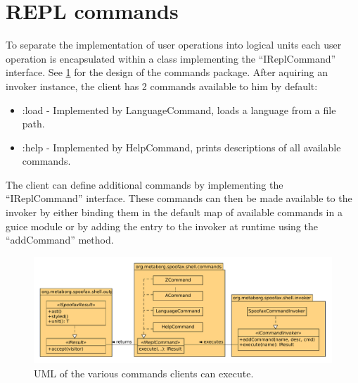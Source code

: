 \section{REPL commands}
\label{sec:commands}

To separate the implementation of user operations into logical units each user
operation is encapsulated within a class implementing the ``IReplCommand''
interface. See \cref{fig:uml-commands} for the design of the commands package.
After aquiring an invoker instance, the client has 2 commands available to him
by default:

\begin{itemize}
  \item :load - Implemented by LanguageCommand, loads a language from a file path.
  \item :help - Implemented by HelpCommand, prints descriptions of all available commands.
\end{itemize}

The client can define additional commands by implementing the ``IReplCommand''
interface. These commands can then be made available to the invoker by either
binding them in the default map of available commands in a guice module or by
adding the entry to the invoker at runtime using the ``addCommand'' method.

\begin{figure}[h]
  \centering
  \includegraphics[width=\textwidth]{uml-commands}
  \caption{UML of the various commands clients can execute.}
  \label{fig:uml-commands}
\end{figure}
